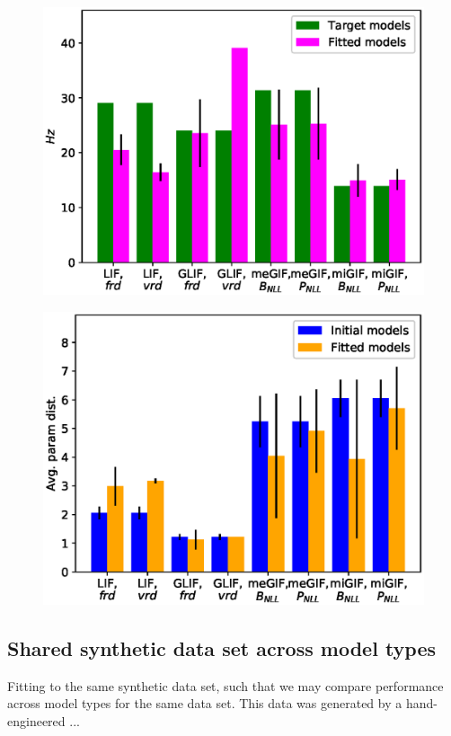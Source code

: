 \documentclass[mphil,deptreport,ianc]{infthesis} %
\begin{document}
\begin{figure}
	\includegraphics{figures/export_rates_saved_all.eps}
\end{figure}

\begin{figure}
	\includegraphics{figures/export_p_dists_saved_all.eps}
\end{figure}



\subsection{Shared synthetic data set across model types}
Fitting to the same synthetic data set, such that we may compare performance across model types for the same data set. 
This data was generated by a hand-engineered ...
\end{document}
